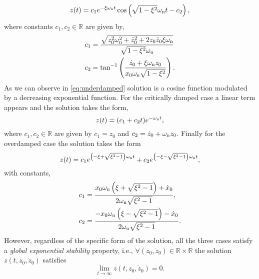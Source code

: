 		\begin{equation}
			\label{eq:underdamped}
			z(t) = c_ {1}e^{-\xi\omega_{\textnormal{n}}t}\cos\left({\sqrt{1-\xi^2}\omega_{\textnormal{n}}t-c_{2}}\right),
		\end{equation}
		where constants $c_{1},c_{2}\in\mathbb{R}$ are given by, 
		\begin{subequations}
			\begin{align*}
				c_{1} &= \frac{\sqrt{z_{0}^2\omega_{\textnormal{n}}^2+\dot{z}_{0}^2+2z_{0}\dot{z}_{0}\xi\omega_{\textnormal{n}}}}{\sqrt{1-\xi^2}\omega_{\textnormal{n}}}\\
				c_{2} &= \tan^{-1}\left(\frac{\dot{z}_{0}+\xi\omega_{\textnormal{n}}z_{0}}{x_ {0}\omega_{\textnormal{n}}\sqrt{1-\xi^2}}\right).
			\end{align*}
		\end{subequations}
		As we can observe in \cref{eq:underdamped} solution is a cosine function modulated by a decreasing exponential function. For the critically damped case a linear term appears and the solution takes the form, 
		\begin{equation}
			\label{eq:criticallydamped}
			z(t) = (c_{1}+c_{2}t)e^{-\omega_{\textnormal{n}}t},
		\end{equation}
		where $c_{1},c_{2}\in\mathbb{R}$ are given by $c_{1} = z_{0}$ and $c_{2} = \dot{z}_{0}+\omega_{\textnormal{n}}z_{0}$. Finally for the overdamped case the solution takes the form
		\begin{equation}
			\label{eq:overdamped}
			z(t) = c_{1}e^{\left(-\xi+\sqrt{\xi^2-1}\right)\omega_{\textnormal{n}}t} + c_{2}e^{\left(-\xi-\sqrt{\xi^2-1}\right)\omega_{\textnormal{n}}t}, 
		\end{equation}
		with constants, 
		\begin{subequations}
			\begin{align*}
				c_{1} &= \frac{x_{0}\omega_{\textnormal{n}}\left(\xi+\sqrt{\xi^2-1}\right)+\dot{x}_{0}}{2\omega_{\textnormal{n}}\sqrt{\xi^2-1}},\\
				c_{2} &= \frac{-x_{0}\omega_{\textnormal{n}}\left(\xi-\sqrt{\xi^2-1}\right)-\dot{x}_{0}}{2\omega_{\textnormal{n}}\sqrt{\xi^2-1}}.
			\end{align*}
		\end{subequations}
		However, regardless of the specific form of the solution, all the three cases satisfy a \emph{global exponential stability} property, i.e., $\forall(z_{0},\dot{z}_{0})\in\mathbb{R}\times\mathbb{R}$ the solution $z(t,z_{0},\dot{z}_{0})$ satisfies
		\begin{equation*}
			\lim_{t\rightarrow\infty} z(t,z_{0},\dot{z}_{0}) = 0.
		\end{equation*}
